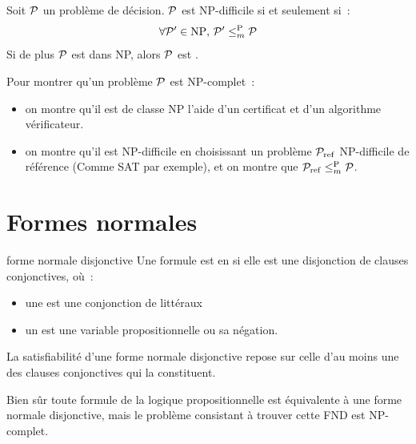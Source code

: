 \begin{theoreme}{}{}
    Soit $\mathcal{P}$ un problème de décision. $\mathcal{P}$ est NP-difficile si et seulement si~:
    $$\forall \mathcal{P}' \in \mathrm{NP},\, \mathcal{P}' \leq_m^{\mathrm{P}} \mathcal{P}$$
    Si de plus $\mathcal{P}$ est dans NP, alors $\mathcal{P}$ est .
\end{theoreme}


\begin{remarque}{}{}
    Pour montrer qu'un problème $\mathcal{P}$ est NP-complet~:
    \begin{itemize}
        \item on montre qu'il est de classe NP  l'aide d'un certificat et d'un algorithme vérificateur.
        \item on montre qu'il est NP-difficile en choisissant un problème $\mathcal{P}_{\mathrm{ref}}$ NP-difficile de référence (Comme SAT par exemple), et on montre que $\mathcal{P}_{\mathrm{ref}} \leq_m^{\mathrm{P}} \mathcal{P}$.
    \end{itemize}
\end{remarque}  

\section{Formes normales}

\begin{definition}{}{forme normale disjonctive}
    Une formule est en  si elle est une disjonction de clauses conjonctives, où~:
    \begin{itemize}
        \item une  est une conjonction de littéraux
        \item un  est une variable propositionnelle ou sa négation.
    \end{itemize}
\end{definition}

\begin{remarque}{}{}
    La satisfiabilité d'une forme normale disjonctive repose sur celle d'au moins une des clauses conjonctives qui la constituent.
\end{remarque}

\begin{remarque}{}{}
    Bien sûr toute formule de la logique propositionnelle est équivalente à une forme normale disjonctive, mais le problème consistant à trouver cette FND est NP-complet.
\end{remarque}

